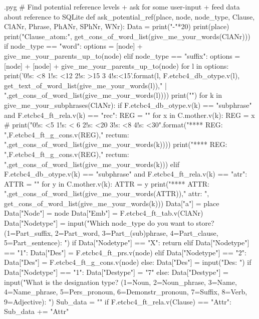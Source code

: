 \documentclass{report}
\makeatletter
\newenvironment{python}{%
  \VerbatimEnvironment
  \minted@resetoptions
  \setkeys{minted@opt}{}
      \begin{VerbatimOut}{\jobname.pyg}}
{%
      \end{VerbatimOut}
      \minted@pygmentize{python}
      \DeleteFile{\jobname.pyg}}
\makeatother
\begin{document}
\begin{python}
# Find potential reference levels + ask for some user-input + feed data about reference to SQLite
def ask_potential_ref(place, node, node_type, Clause, ClANr, Phrase, PhANr, SPhNr, WNr):
        Data = {}
        print("-"*20)
        print(place)
        print("Clause_atom:", get_cons_of_word_list(give_me_your_words(ClANr)))
        if node_type == "word":
            options = [node] + give_me_your_parents_up_to(node)
        elif node_type == "suffix":
            options = [node] + [node] + give_me_your_parents_up_to(node)
        for l in options:
            print('{0!s: <8} {1!s: <12} {2!s: >15} {3} {4!s:<15}'.format(l, F.etcbc4_db_otype.v(l), get_text_of_word_list(give_me_your_words(l))," | ",get_cons_of_word_list(give_me_your_words(l))))
        print("\n")
        for k in give_me_your_subphrases(ClANr):
            if F.etcbc4_db_otype.v(k) == "subphrase" and F.etcbc4_ft_rela.v(k) == "rec":
                REG = ""
                for x in C.mother.v(k):
                    REG = x
#                print("{0!s: <5} {1!s: < 6} {2!s: <20} {3!s: <8} {4!s: <30}".format("**** REG: ",F.etcbc4_ft_g_cons.v(REG)," rectum: ",get_cons_of_word_list(give_me_your_words(k))))
                print("**** REG: ",F.etcbc4_ft_g_cons.v(REG)," rectum: ",get_cons_of_word_list(give_me_your_words(k)))
            elif F.etcbc4_db_otype.v(k) == "subphrase" and F.etcbc4_ft_rela.v(k) == "atr":
                ATTR = ""
                for y in C.mother.v(k):
                    ATTR = y
                print("**** ATTR: ",get_cons_of_word_list(give_me_your_words(ATTR))," attr: ", get_cons_of_word_list(give_me_your_words(k)))
        Data["a"] = place
        Data["Node"] = node
        Data["Emb"] = F.etcbc4_ft_tab.v(ClANr)
        Data["Nodetype"] = input("Which node_type do you want to store? (1=Part_suffix, 2=Part_word, 3=Part_(sub)phrase, 4=Part_clause, 5=Part_sentence): ")
        if Data["Nodetype"] == "X":
            return
        elif Data["Nodetype"] == "1":
            Data["Des"] = F.etcbc4_ft_prs.v(node)
        elif Data["Nodetype"] == "2":
            Data["Des"] = F.etcbc4_ft_g_cons.v(node)
        else:
            Data["Des"] = input("Des: ")
        if Data["Nodetype"] == "1":
            Data["Destype"] = "7"
        else:
            Data["Destype"] = input("What is the designation type? (1=Noun, 2=Noun_phrase, 3=Name, 4=Name_phrase, 5=Pers_pronoun, 6=Demonstr_pronoun, 7=Suffix, 8=Verb, 9=Adjective): ")
        Sub_data = ""
        if F.etcbc4_ft_rela.v(Clause) == "Attr":
            Sub_data += "Attr"

\end{python}
\end{document}
